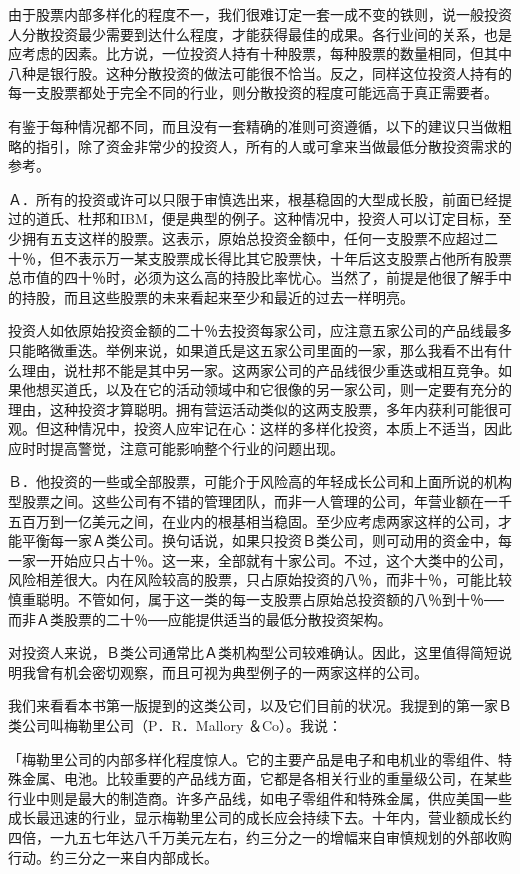 \documentclass[UTF8,a4paper,zihao=-4,fontset = windows]{ctexart} %
\begin{document}
由于股票内部多样化的程度不一，我们很难订定一套一成不变的铁则，说一般投资人分散投资最少需要到达什么程度，才能获得最佳的成果。各行业间的关系，也是应考虑的因素。比方说，一位投资人持有十种股票，每种股票的数量相同，但其中八种是银行股。这种分散投资的做法可能很不恰当。反之，同样这位投资人持有的每一支股票都处于完全不同的行业，则分散投资的程度可能远高于真正需要者。

有鉴于每种情况都不同，而且没有一套精确的准则可资遵循，以下的建议只当做粗略的指引，除了资金非常少的投资人，所有的人或可拿来当做最低分散投资需求的参考。

Ａ．所有的投资或许可以只限于审慎选出来，根基稳固的大型成长股，前面已经提过的道氏、杜邦和IBM，便是典型的例子。这种情况中，投资人可以订定目标，至少拥有五支这样的股票。这表示，原始总投资金额中，任何一支股票不应超过二十％，但不表示万一某支股票成长得比其它股票快，十年后这支股票占他所有股票总市值的四十％时，必须为这么高的持股比率忧心。当然了，前提是他很了解手中的持股，而且这些股票的未来看起来至少和最近的过去一样明亮。

投资人如依原始投资金额的二十％去投资每家公司，应注意五家公司的产品线最多只能略微重迭。举例来说，如果道氏是这五家公司里面的一家，那么我看不出有什么理由，说杜邦不能是其中另一家。这两家公司的产品线很少重迭或相互竞争。如果他想买道氏，以及在它的活动领域中和它很像的另一家公司，则一定要有充分的理由，这种投资才算聪明。拥有营运活动类似的这两支股票，多年内获利可能很可观。但这种情况中，投资人应牢记在心：这样的多样化投资，本质上不适当，因此应时时提高警觉，注意可能影响整个行业的问题出现。

Ｂ．他投资的一些或全部股票，可能介于风险高的年轻成长公司和上面所说的机构型股票之间。这些公司有不错的管理团队，而非一人管理的公司，年营业额在一千五百万到一亿美元之间，在业内的根基相当稳固。至少应考虑两家这样的公司，才能平衡每一家Ａ类公司。换句话说，如果只投资Ｂ类公司，则可动用的资金中，每一家一开始应只占十％。这一来，全部就有十家公司。不过，这个大类中的公司，风险相差很大。内在风险较高的股票，只占原始投资的八％，而非十％，可能比较慎重聪明。不管如何，属于这一类的每一支股票占原始总投资额的八％到十％──而非Ａ类股票的二十％──应能提供适当的最低分散投资架构。

对投资人来说，Ｂ类公司通常比Ａ类机构型公司较难确认。因此，这里值得简短说明我曾有机会密切观察，而且可视为典型例子的一两家这样的公司。

我们来看看本书第一版提到的这类公司，以及它们目前的状况。我提到的第一家Ｂ类公司叫梅勒里公司（P．R．Mallory ＆Co）。我说：

「梅勒里公司的内部多样化程度惊人。它的主要产品是电子和电机业的零组件、特殊金属、电池。比较重要的产品线方面，它都是各相关行业的重量级公司，在某些行业中则是最大的制造商。许多产品线，如电子零组件和特殊金属，供应美国一些成长最迅速的行业，显示梅勒里公司的成长应会持续下去。十年内，营业额成长约四倍，一九五七年达八千万美元左右，约三分之一的增幅来自审慎规划的外部收购行动。约三分之一来自内部成长。
\end{document}
